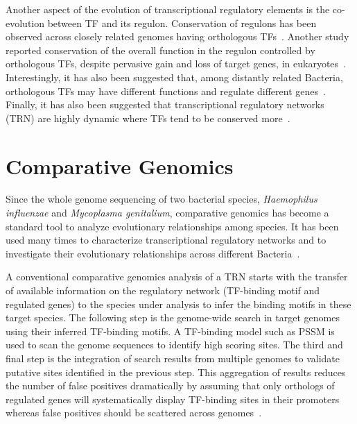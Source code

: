 Another aspect of the evolution of transcriptional regulatory elements is the
co-evolution between TF and its regulon. Conservation of regulons has been
observed across closely related genomes having orthologous
TFs~\cite{mironov1999computer, tan2001comparative}. Another study reported
conservation of the overall function in the regulon controlled by orthologous
TFs, despite pervasive gain and loss of target genes, in
eukaryotes~\cite{habib2012functional}. Interestingly, it has also been
suggested that, among distantly related Bacteria, orthologous TFs may have
different functions and regulate different
genes~\cite{price2007orthologous}. Finally, it has also been suggested that
transcriptional regulatory networks (TRN) are highly dynamic where TFs tend to
be conserved more~\cite{babu2006evolutionary, chavez2006bacterial}.

\section{Comparative Genomics}

Since the whole genome sequencing of two bacterial species, \textit{Haemophilus
  influenzae} and \textit{Mycoplasma genitalium}, comparative genomics has
become a standard tool to analyze evolutionary relationships among species. It
has been used many times to characterize transcriptional regulatory
networks and to investigate their evolutionary relationships across different
Bacteria~\cite{gelfand2000prediction, ravcheev2013genomic,
  meireles2009comparative, kellis2004methods, erill2004differences,
  erill2007aeons, sanchez2012analysis, cornish2012inference}.

A conventional comparative genomics analysis of a TRN starts with the transfer
of available information on the regulatory network (TF-binding motif and
regulated genes) to the species under analysis to infer the binding motifs in
these target species. The following step is the genome-wide search in target
genomes using their inferred TF-binding motifs. A TF-binding model such as PSSM
is used to scan the genome sequences to identify high scoring sites. The third
and final step is the integration of search results from multiple genomes to
validate putative sites identified in the previous step. This aggregation of
results reduces the number of false positives dramatically by assuming that
only orthologs of regulated genes will systematically display TF-binding sites
in their promoters whereas false positives should be scattered across
genomes~\cite{rodionov2007comparative}.


